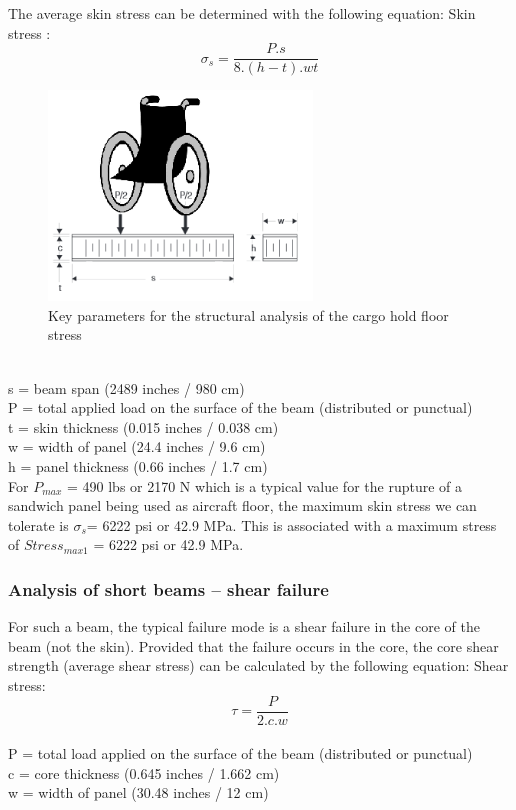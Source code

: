 The average skin stress can be determined with the following equation:
Skin stress : \[ \sigma_{s} = \frac{P.s}{8.(h-t).wt} \]
\begin{figure}[h]
\centering
\includegraphics[width=7cm]{images/structural_analysis}
\caption{Key parameters for the structural analysis of the cargo hold floor stress}
\label{fig: structural_analysis}
\end{figure}
\\
s = beam span (2489 inches / 980 cm) \\
P = total applied load on the surface of the beam (distributed or punctual) \\
t = skin thickness (0.015 inches / 0.038 cm) \\
w = width of panel (24.4 inches / 9.6 cm) \\
h = panel thickness (0.66 inches / 1.7 cm) \\

For $ P_{max}$ = 490 lbs or 2170 N which is a typical value for the rupture of a sandwich panel being used as aircraft floor, the maximum skin stress we can tolerate is $ \sigma_{s}$= 6222 psi or 42.9 MPa.
This is associated with a maximum stress of $Stress_{max 1}$ = 6222 psi or 42.9 MPa.
\subsubsection{Analysis of short beams – shear failure}
For such a beam, the typical failure mode is a shear failure in the core of the beam (not the skin). Provided that the failure occurs in the core, the core shear strength (average shear stress) can be calculated by the following equation:
Shear stress: \[ \tau = \frac{P}{2.c.w} \]
\\
P = total load applied on the surface of the beam (distributed or punctual)\\
c = core thickness (0.645 inches / 1.662 cm)\\
w = width of panel (30.48 inches / 12 cm)\\

